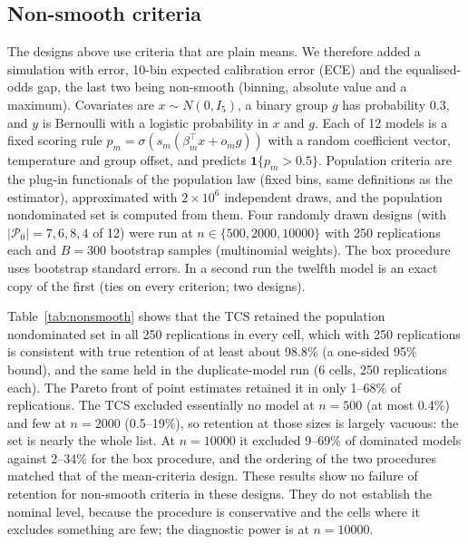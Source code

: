 \documentclass[pdflatex,sn-mathphys-num,iicol]{sn-jnl}
\theoremstyle{thmstyleone}
\theoremstyle{thmstyletwo}
\begin{document}
\subsection{Non-smooth criteria}\label{sec:nonsmooth}
The designs above use criteria that are plain means. We therefore added a simulation with error, 10-bin expected calibration error (ECE) and the equalised-odds gap, the last two being non-smooth (binning, absolute value and a maximum). Covariates are $x\sim N(0,I_5)$, a binary group $g$ has probability 0.3, and $y$ is Bernoulli with a logistic probability in $x$ and $g$. Each of 12 models is a fixed scoring rule $p_m=\sigma(s_m(\beta_m^\top x+o_m g))$ with a random coefficient vector, temperature and group offset, and predicts $\mathbf 1\{p_m>0.5\}$. Population criteria are the plug-in functionals of the population law (fixed bins, same definitions as the estimator), approximated with $2\times10^6$ independent draws, and the population nondominated set is computed from them. Four randomly drawn designs (with $|\mathcal{P}_0|=7,6,8,4$ of 12) were run at $n\in\{500,2000,10000\}$ with 250 replications each and $B=300$ bootstrap samples (multinomial weights). The box procedure uses bootstrap standard errors. In a second run the twelfth model is an exact copy of the first (ties on every criterion; two designs).

Table~\ref{tab:nonsmooth} shows that the TCS retained the population nondominated set in all 250 replications in every cell, which with 250 replications is consistent with true retention of at least about 98.8\% (a one-sided 95\% bound), and the same held in the duplicate-model run (6 cells, 250 replications each). The Pareto front of point estimates retained it in only 1--68\% of replications. The TCS excluded essentially no model at $n=500$ (at most 0.4\%) and few at $n=2000$ (0.5--19\%), so retention at those sizes is largely vacuous: the set is nearly the whole list. At $n=10000$ it excluded 9--69\% of dominated models against 2--34\% for the box procedure, and the ordering of the two procedures matched that of the mean-criteria design. These results show no failure of retention for non-smooth criteria in these designs. They do not establish the nominal level, because the procedure is conservative and the cells where it excludes something are few; the diagnostic power is at $n=10000$.
\end{document}
